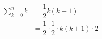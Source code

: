 \documentclass{report}
\begin{document}
\begin{align*}
    \sum\limits_{k=0}^{n} k & = \dfrac{1}{2}k(k+1)                                   \\
                            & = \dfrac{1}{2} \cdot \dfrac{1}{2} \cdot k(k+1) \cdot 2 \\
\end{align*}
\end{document}
